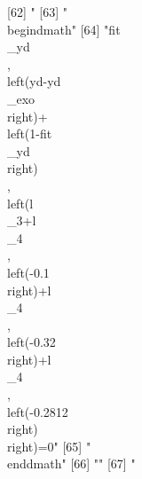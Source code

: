 [62] "%
[63] "\\begin{dmath}"                                                                                                                                                                                                                                                                                
[64] "{{fit\\_yd}}\\, \\left({yd}-{{yd\\_exo}}\\right)+\\left(1-{{fit\\_yd}}\\right)\\, \\left({{l\\_3}}+{{l\\_4}}\\, \\left(-0.1\\right)+{{l\\_4}}\\, \\left(-0.32\\right)+{{l\\_4}}\\, \\left(-0.2812\\right)\\right)=0"                                                                           
[65] "\\end{dmath}"                                                                                                                                                                                                                                                                                  
[66] ""                                                                                                                                                                                                                                                                                              
[67] "%
